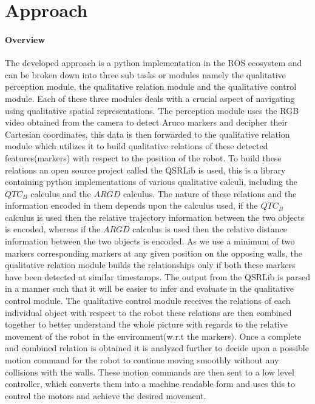 \section{Approach}
\paragraph{Overview}The developed approach is a python implementation in the ROS ecosystem and can be broken down into three sub tasks or modules namely the qualitative perception module, the qualitative relation module and the qualitative control module. Each of these three modules deals with a crucial aspect of navigating using qualitative spatial representations. The perception module uses the RGB video obtained from the camera to detect Aruco markers and decipher their Cartesian coordinates, this data is then forwarded to the qualitative relation module which utilizes it to build qualitative relations of these detected features(markers) with respect to the position of the robot. To build these relations an open source project called the QSRLib is used, this is a library containing python implementations of various qualitative calculi, including the $QTC_B$ calculus and the $ARGD$ calculus.  The nature of these relations and the information encoded in them depends upon the calculus used, if the $QTC_B$ calculus is used then the relative trajectory information between the two objects is encoded, whereas if the $ARGD$ calculus is used then the relative distance information between the two objects is encoded. As we use a minimum of two markers corresponding markers at any given position on the opposing walls, the qualitative relation module builds the relationships only if both these markers have been detected at similar timestamps. The output from the QSRLib is parsed in a manner such that it will be easier to infer and evaluate in the qualitative control module. The qualitative control module receives the relations of each individual object with respect to the robot these relations are then combined together to better understand the whole picture with regards to the relative movement of the robot in the environment(w.r.t the markers). Once a complete and combined relation is obtained it is analyzed further to decide upon a possible motion command for the robot to continue moving smoothly without any collisions with the walls. These motion commands are then sent to a low level controller, which converts them into a machine readable form and uses this to control the motors and achieve the desired movement.

